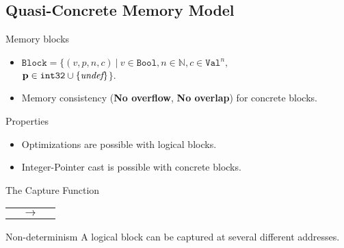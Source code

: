 \subsection{Quasi-Concrete Memory Model}
\begin{frame}{\subsecname}

  \begin{block}{Memory blocks}
    \begin{itemize}
    \item $\texttt{Block}=\{(v,p,n,c)~|~v\in\texttt{Bool},n\in\mathbb{N},c\in\texttt{Val}^{n},$\\
      {\color{purple}$\mathbf{p\in\texttt{int32}\cup\{\textit{undef}\}}$}$\}$.
    \item Memory consistency (\textbf{No overflow}, \textbf{No overlap}) for concrete blocks.
    \end{itemize}
  \end{block}
  \vfill
  \begin{exampleblock}{Properties}
    \begin{itemize}
    \item Optimizations are possible with logical blocks.
    \item Integer-Pointer cast is possible with concrete blocks.
    \end{itemize}
  \end{exampleblock}
  
\end{frame}

\begin{frame}{The Capture Function}

  \begin{tabular}{l c r}
     & $\longrightarrow$ &
    
  \end{tabular}
  \vfill
  \begin{alertblock}{Non-determinism}
    A logical block can be captured at several different addresses.
  \end{alertblock}
  
\end{frame}

%    
%    
%
